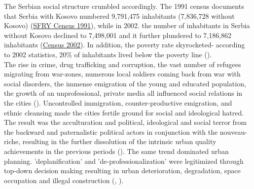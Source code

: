 \documentclass[11pt]{report}
\begin{document}
{{{{The Serbian social structure crumbled accordingly. The 1991 census documents that Serbia with Kosovo numbered 9,791,475 inhabitants (7,836,728 without Kosovo) (\href{ref}{SFRY Census 1991}), while in 2002. the number of inhabitants in Serbia without Kosovo declined to 7,498,001 and it further plundered to 7,186,862 inhabitants (\href{ref}{Census 2002}).
In addition, the poverty rate skyrocketed- according to 2002 statistics, 20\% of inhabitants lived below the poverty line (\href{Vlada}{\citealt{strategija_vlade_r._srbije_strategija_2003}}).
\\

The rise in crime, drug trafficking and corruption, the vast number of refugees migrating from war-zones, numerous local soldiers coming back from war with social disorders, the immense emigration of the young and educated population, the growth of an unprofessional, private media all influenced social relations in the cities (\href{Doytchinov}{\citealt{doytchinov_urban_2015}}).
Uncontrolled immigration, counter-productive emigration, and ethnic cleansing made the cities fertile ground for social and ideological hatred. The result was the acculturation and political, ideological and social terror from the backward and paternalistic political actors in conjunction with the nouveau-riche, resulting in the further dissolution of the intrinsic urban quality achievements in the previous periods (\href{Doytchinov}{\citealt{doytchinov_belgrade_2015}}).
The same trend dominated urban planning. ’deplanification’ and ’de-professionalization’ were legitimized through top-down decision making resulting in urban deterioration, degradation, space occupation and illegal construction (\href{Vujovic}{\citealt{vujovic_belgrades_2007}}, \href{Vukmirovic}{\citealt{vukmirovic_city_2013}}).
\\

}}}}
\end{document}
